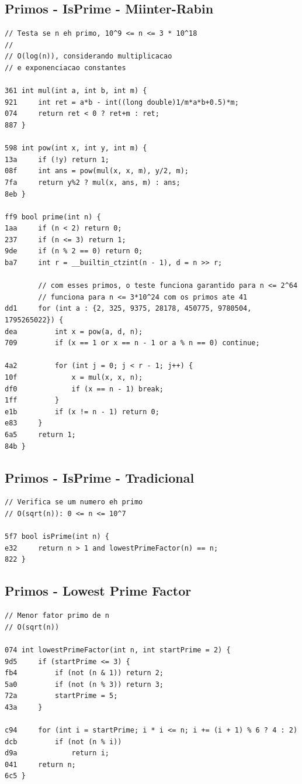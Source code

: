 \documentclass[11pt, a4paper, twoside]{article}
\begin{document}
\subsection{Primos - IsPrime - Miinter-Rabin}
\begin{lstlisting}
// Testa se n eh primo, 10^9 <= n <= 3 * 10^18
//
// O(log(n)), considerando multiplicacao
// e exponenciacao constantes

361 int mul(int a, int b, int m) {
921 	int ret = a*b - int((long double)1/m*a*b+0.5)*m;
074 	return ret < 0 ? ret+m : ret;
887 }

598 int pow(int x, int y, int m) {
13a 	if (!y) return 1;
08f 	int ans = pow(mul(x, x, m), y/2, m);
7fa 	return y%2 ? mul(x, ans, m) : ans;
8eb }

ff9 bool prime(int n) {
1aa 	if (n < 2) return 0;
237 	if (n <= 3) return 1;
9de 	if (n % 2 == 0) return 0;
ba7 	int r = __builtin_ctzint(n - 1), d = n >> r;
    
     	// com esses primos, o teste funciona garantido para n <= 2^64
    	// funciona para n <= 3*10^24 com os primos ate 41
dd1 	for (int a : {2, 325, 9375, 28178, 450775, 9780504, 1795265022}) {
dea 		int x = pow(a, d, n);
709 		if (x == 1 or x == n - 1 or a % n == 0) continue;
    		
4a2 		for (int j = 0; j < r - 1; j++) {
10f 			x = mul(x, x, n);
df0 			if (x == n - 1) break;
1ff 		}
e1b 		if (x != n - 1) return 0;
e83 	}
6a5 	return 1;
84b }
\end{lstlisting}

\subsection{Primos - IsPrime - Tradicional}
\begin{lstlisting}
// Verifica se um numero eh primo
// O(sqrt(n)): 0 <= n <= 10^7 

5f7 bool isPrime(int n) {
e32     return n > 1 and lowestPrimeFactor(n) == n;
822 }
\end{lstlisting}

\subsection{Primos - Lowest Prime Factor}
\begin{lstlisting}
// Menor fator primo de n
// O(sqrt(n))

074 int lowestPrimeFactor(int n, int startPrime = 2) {
9d5     if (startPrime <= 3) {
fb4         if (not (n & 1)) return 2;
5a0         if (not (n % 3)) return 3;
72a         startPrime = 5;
43a     }
    
c94     for (int i = startPrime; i * i <= n; i += (i + 1) % 6 ? 4 : 2)
dcb         if (not (n % i))
d9a             return i;
041     return n;
6c5 }
\end{lstlisting}
\end{document}
